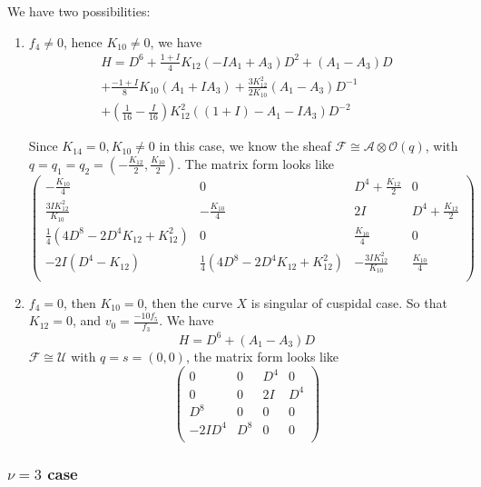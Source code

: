 \documentclass[11pt]{article}
\theoremstyle{definition}
\theoremstyle{plain}
\numberwithin{equation}{section}
\begin{document}
We have two possibilities:
\begin{enumerate}
	\item $f_4\neq 0$, hence $K_{10}\neq 0$, we have 
\begin{multline*}
	H=D^6+\frac{1+I}{4}K_{12}(-IA_1+A_3)D^2+(A_1-A_3)D
	\\+\frac{-1+I}{8}K_{10}(A_1+IA_3)+\frac{3K_{12}^2}{2K_{10}}(A_1-A_3)D^{-1}
	\\+(\frac{1}{16}-\frac{I}{16}) K_{12}^2 ((1+I)-A_1-I A_3)D^{-2}
\end{multline*}

Since $K_{14}= 0,K_{10}\neq 0$ in this case, we know the sheaf $\mathcal{F}\cong \mathcal{A}\otimes \mathcal{O}(q)$, with $q=q_1=q_2=(-\frac{K_{12}}{2},\frac{K_{10}}{2})$. The matrix form looks like
$$
\left(
\begin{array}{cccc}
	-\frac{K_{10}}{4} & 0 & D^4+\frac{K_{12}}{2} & 0 \\
	\frac{3 I K_{12}^2}{K_{10}} & -\frac{K_{10}}{4} & 2 I & D^4+\frac{K_{12}}{2} \\
	\frac{1}{4} \left(4 D^8-2 D^4 K_{12}+K_{12}^2\right) & 0 & \frac{K_{10}}{4} & 0 \\
	-2 I \left(D^4-K_{12}\right) & \frac{1}{4} \left(4 D^8-2 D^4 K_{12}+K_{12}^2\right) & -\frac{3 I K_{12}^2}{K_{10}} & \frac{K_{10}}{4} \\
\end{array}
\right)
$$
\item $f_4=0$, then $K_{10}=0$, then the curve $X$ is singular of cuspidal case. So that $K_{12}=0$, and $v_0=\frac{-10f_5}{f_3}$. We have
$$
H=D^6+(A_1-A_3)D
$$
$\mathcal{F}\cong \mathcal{U}$ with $q=s=(0,0)$, the matrix form looks like 
$$
\left(
\begin{array}{cccc}
	0 & 0 & D^4 & 0 \\
	0 & 0 & 2 I & D^4 \\
	D^8 & 0 & 0 & 0 \\
	-2 I D^4 & D^8 & 0 & 0 \\
\end{array}
\right)
$$

\end{enumerate}

\subsubsection{$\nu= 3$ case}
\end{document}
